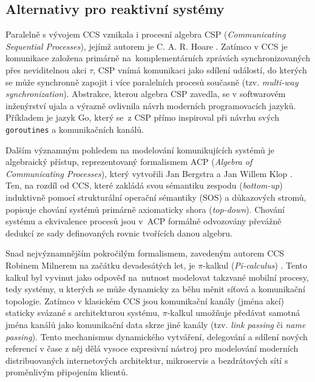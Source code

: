 \subsection{Alternativy pro reaktivní systémy}
Paralelně s vývojem CCS vznikala i procesní algebra CSP (\textit{Communicating Sequential Processes}), jejímž autorem je C. A. R. Hoare \cite{graham_1978_programming}. 
Zatímco v CCS je komunikace založena primárně na~komplementárních zprávách synchronizovaných přes neviditelnou akci $\tau$, 
CSP vnímá komunikaci jako sdílení událostí, do kterých se může synchronně zapojit i více paralelních procesů současně (tzv. \textit{multi-way synchronization}). 
Abstrakce, kterou algebra CSP zavedla, se v softwarovém inženýrství ujala a výrazně ovlivnila návrh moderních programovacích jazyků. Příkladem je jazyk Go, který se~z CSP přímo inspiroval při návrhu svých \texttt{goroutines} a komunikačních kanálů.

Dalším významným pohledem na modelování komunikujících systémů je algebraický přístup, reprezentovaný formalismem ACP (\textit{Algebra of Communicating Processes}), který vytvořili Jan Bergstra a Jan Willem Klop \cite{bergstra_1985_algebra}. 
Ten, na rozdíl od CCS, které zakládá svou sémantiku zespodu (\textit{bottom-up}) induktivně pomocí strukturální operační sémantiky (SOS) a důkazových stromů, 
popisuje chování systémů primárně axiomaticky shora (\textit{top-down}). Chování systému a ekvivalence procesů jsou v~ACP formálně odvozovány převážně dedukcí ze sady definovaných rovnic tvořících danou algebru.

Snad nejvýznamnějším pokročilým formalismem, zavedeným autorem CCS Robinem Milnerem na začátku devadesátých let, je $\pi$-kalkul (\textit{Pi-calculus}) \cite{kobayashi_1999_linearity}. 
Tento kalkul byl vyvinut jako odpověď na~nutnost modelovat takzvané mobilní procesy, tedy systémy, u kterých se může dynamicky za běhu měnit síťová a komunikační topologie. 
Zatímco v klasickém CCS jsou komunikační kanály (jména akcí) staticky svázané s architekturou systému, $\pi$-kalkul umožňuje předávat samotná jména kanálů jako komunikační data skrze jiné kanály (tzv. \textit{link passing} či \textit{name passing}). 
Tento mechanismus dynamického vytváření, delegování a sdílení nových referencí v čase z něj dělá vysoce expresivní nástroj pro modelování moderních distribuovaných internetových architektur, mikroservis a bezdrátových sítí s proměnlivým připojením klientů.

\endinput